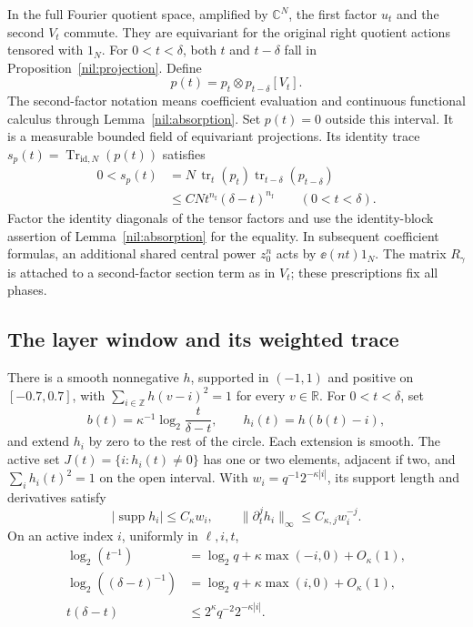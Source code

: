 In the full Fourier quotient space, amplified by \(\mathbb C^N\),
the first factor \(u_t\) and the second \(V_t\) commute. They are
equivariant for the original right quotient actions tensored
with \(1_N\).
For \(0<t<\delta\), both \(t\) and \(t-\delta\) fall in
Proposition~\ref{nil:projection}. Define
\begin{equation}\label{nil:pt}
 p(t)=p_t\otimes p_{t-\delta}[V_t].
\end{equation}
The second-factor notation means coefficient evaluation and
continuous functional calculus through Lemma~\ref{nil:absorption}.
Set \(p(t)=0\) outside this interval.
It is a measurable bounded field of equivariant projections.
Its identity trace \(s_p(t)=\operatorname{Tr}_{\mathrm{id},N}(p(t))\)
satisfies
\begin{equation}\label{nil:two-factor-trace}
 \begin{split}
 0<s_p(t)
 &=N\,\operatorname{tr}_t(p_t)
               \operatorname{tr}_{t-\delta}(p_{t-\delta})\\
 &\le C N t^{n_{\mathrm f}}(\delta-t)^{n_{\mathrm f}}
                  \qquad(0<t<\delta).
 \end{split}
\end{equation}
Factor the identity diagonals of the tensor factors and use
the identity-block assertion of Lemma~\ref{nil:absorption}
for the equality. In subsequent coefficient formulas, an
additional shared central power \(z_0^n\) acts by \(\ee(nt)1_N\).
The matrix \(R_\gamma\) is attached to a second-factor section
term as in \(V_t\); these prescriptions fix all phases.

\subsection{The layer window and its weighted trace}

\begin{lemma}\label{nil:window}
There is a smooth nonnegative \(h\), supported in \((-1,1)\)
and positive on \([-0.7,0.7]\), with
\(\sum_{i\in\mathbb Z}h(v-i)^2=1\) for every \(v\in\mathbb R\).
For \(0<t<\delta\), set
\begin{equation}\label{nil:h}
 b(t)=\kappa^{-1}\log_2\frac{t}{\delta-t},\qquad
 h_i(t)=h(b(t)-i),
\end{equation}
and extend \(h_i\) by zero to the rest of the circle.
Each extension is smooth. The active set
\(J(t)=\{i:h_i(t)\ne0\}\) has one or two elements, adjacent
if two, and \(\sum_i h_i(t)^2=1\) on the open interval.
With \(w_i=q^{-1}2^{-\kappa|i|}\), its support length and
derivatives satisfy
\[
 |\operatorname{supp}h_i|\le C_\kappa w_i,\qquad
 \|\partial_t^j h_i\|_\infty\le C_{\kappa,j}w_i^{-j}.
\]
On an active index \(i\), uniformly in \(\ell,i,t\),
\begin{align}
 \log_2(t^{-1})
 &=\log_2q+\kappa\max(-i,0)+O_\kappa(1),\label{nil:log-t}\\
 \log_2((\delta-t)^{-1})
 &=\log_2q+\kappa\max(i,0)+O_\kappa(1),\label{nil:log-tau}\\
 t(\delta-t)&\le 2^\kappa q^{-2}2^{-\kappa|i|}.
                                                  \label{nil:product}
\end{align}
\end{lemma}

